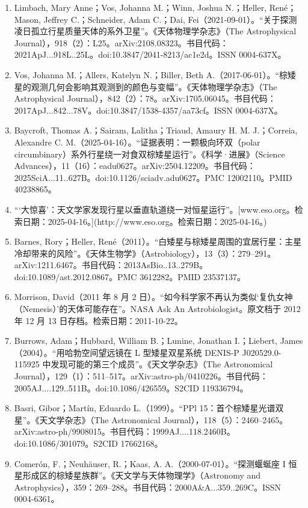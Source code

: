\begin{enumerate}
\item Limbach, Mary Anne；Vos, Johanna M.；Winn, Joshua N.；Heller, René；Mason, Jeffrey C.；Schneider, Adam C.；Dai, Fei（2021-09-01）。“关于探测凌日孤立行星质量天体的系外卫星”。《天体物理学杂志》（The Astrophysical Journal），918（2）：L25。arXiv:2108.08323。书目代码：2021ApJ...918L..25L。doi:10.3847/2041-8213/ac1e2d。ISSN 0004-637X。
\item Vos, Johanna M.；Allers, Katelyn N.；Biller, Beth A.（2017-06-01）。“棕矮星的观测几何会影响其观测到的颜色与变幅”。《天体物理学杂志》（The Astrophysical Journal），842（2）：78。arXiv:1705.06045。书目代码：2017ApJ...842...78V。doi:10.3847/1538-4357/aa73cf。ISSN 0004-637X。
\item Baycroft, Thomas A.；Sairam, Lalitha；Triaud, Amaury H. M. J.；Correia, Alexandre C. M.（2025-04-16）。“证据表明：一颗极向环双（polar circumbinary）系外行星绕一对食双棕矮星运行”。《科学·进展》（Science Advances），11（16）：eadu0627。arXiv:2504.12209。书目代码：2025SciA...11..627B。doi:10.1126/sciadv.adu0627。PMC 12002110。PMID 40238865。
\item “‘大惊喜’：天文学家发现行星以垂直轨道绕一对恒星运行”。[www.eso.org。检索日期：2025-04-16。](http://www.eso.org。检索日期：2025-04-16。)
\item Barnes, Rory；Heller, René（2011）。“白矮星与棕矮星周围的宜居行星：主星冷却带来的风险”。《天体生物学》（Astrobiology），13（3）：279–291。arXiv:1211.6467。书目代码：2013AsBio..13..279B。doi:10.1089/ast.2012.0867。PMC 3612282。PMID 23537137。
\item Morrison, David（2011 年 8 月 2 日）。“如今科学家不再认为类似‘复仇女神（Nemesis）’的天体可能存在”。NASA Ask An Astrobiologist。原文档于 2012 年 12 月 13 日存档。检索日期：2011-10-22。
\item Burrows, Adam；Hubbard, William B.；Lunine, Jonathan I.；Liebert, James（2004）。“用哈勃空间望远镜在 L 型矮星双星系统 DENIS-P J020529.0-115925 中发现可能的第三个成员”。《天文学杂志》（The Astronomical Journal），129（1）：511–517。arXiv:astro-ph/0410226。书目代码：2005AJ....129..511B。doi:10.1086/426559。S2CID 119336794。
\item Basri, Gibor；Martín, Eduardo L.（1999）。“PPl 15：首个棕矮星光谱双星”。《天文学杂志》（The Astronomical Journal），118（5）：2460–2465。arXiv:astro-ph/9908015。书目代码：1999AJ....118.2460B。doi:10.1086/301079。S2CID 17662168。
\item Comerón, F.；Neuhäuser, R.；Kaas, A. A.（2000-07-01）。“探测蝘蜒座 I 恒星形成区的棕矮星族群”。《天文学与天体物理学》（Astronomy and Astrophysics），359：269–288。书目代码：2000A&A...359..269C。ISSN 0004-6361。

\end{enumerate}
